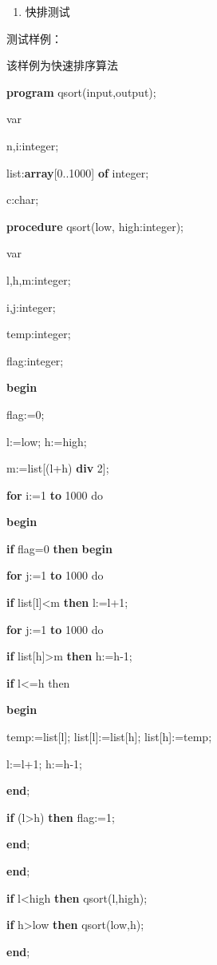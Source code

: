 \documentclass[]{ctexart}
\newenvironment{Shaded}{}{}
\newcommand{\DataTypeTok}[1]{\textcolor[rgb]{0.56,0.13,0.00}{#1}}
\newcommand{\DecValTok}[1]{\textcolor[rgb]{0.25,0.63,0.44}{#1}}
\newcommand{\KeywordTok}[1]{\textcolor[rgb]{0.00,0.44,0.13}{\textbf{#1}}}
\newcommand{\NormalTok}[1]{#1}
\begin{document}
\begin{enumerate}
\def\labelenumi{\arabic{enumi}.}
\item
  快排测试
\end{enumerate}

测试样例：

该样例为快速排序算法

\begin{Shaded}
\begin{Highlighting}[]
\KeywordTok{program}\NormalTok{ qsort(input,output);
}
\NormalTok{var
}
\NormalTok{	n,i:}\DataTypeTok{integer}\NormalTok{;
}
\NormalTok{	list:}\KeywordTok{array}\NormalTok{[}\DecValTok{0}\NormalTok{..}\DecValTok{1000}\NormalTok{] }\KeywordTok{of} \DataTypeTok{integer}\NormalTok{;
}
\NormalTok{	c:}\DataTypeTok{char}\NormalTok{;
}
\KeywordTok{procedure}\NormalTok{ qsort(low, high:}\DataTypeTok{integer}\NormalTok{);
}
\NormalTok{var
}
\NormalTok{	l,h,m:}\DataTypeTok{integer}\NormalTok{;
}
\NormalTok{	i,j:}\DataTypeTok{integer}\NormalTok{;
}
\NormalTok{	temp:}\DataTypeTok{integer}\NormalTok{;
}
\NormalTok{	flag:}\DataTypeTok{integer}\NormalTok{;
}
\KeywordTok{begin}

\NormalTok{	flag:=}\DecValTok{0}\NormalTok{;
}
\NormalTok{	l:=low; h:=high;
}
\NormalTok{	m:=list[(l+h) }\KeywordTok{div} \DecValTok{2}\NormalTok{];
}
	\KeywordTok{for}\NormalTok{ i:=}\DecValTok{1} \KeywordTok{to} \DecValTok{1000}\NormalTok{ do
}
	\KeywordTok{begin}

	\KeywordTok{if}\NormalTok{ flag=}\DecValTok{0} \KeywordTok{then} \KeywordTok{begin}

		\KeywordTok{for}\NormalTok{ j:=}\DecValTok{1} \KeywordTok{to} \DecValTok{1000}\NormalTok{ do
}
			\KeywordTok{if}\NormalTok{ list[l]<m }\KeywordTok{then}\NormalTok{ l:=l+}\DecValTok{1}\NormalTok{;
}
		\KeywordTok{for}\NormalTok{ j:=}\DecValTok{1} \KeywordTok{to} \DecValTok{1000}\NormalTok{ do
}
			\KeywordTok{if}\NormalTok{ list[h]>m }\KeywordTok{then}\NormalTok{ h:=h}\DecValTok{-1}\NormalTok{;
}
		\KeywordTok{if}\NormalTok{ l<=h then
}
		\KeywordTok{begin}

\NormalTok{			temp:=list[l]; list[l]:=list[h]; list[h]:=temp;
}
\NormalTok{			l:=l+}\DecValTok{1}\NormalTok{; h:=h}\DecValTok{-1}\NormalTok{;
}
		\KeywordTok{end}\NormalTok{;
}
		\KeywordTok{if}\NormalTok{ (l>h) }\KeywordTok{then}\NormalTok{ flag:=}\DecValTok{1}\NormalTok{;
}
	\KeywordTok{end}\NormalTok{;
}
	\KeywordTok{end}\NormalTok{;
}
	\KeywordTok{if}\NormalTok{ l<high }\KeywordTok{then}\NormalTok{ qsort(l,high);
}
	\KeywordTok{if}\NormalTok{ h>low }\KeywordTok{then}\NormalTok{ qsort(low,h);
}
\KeywordTok{end}\NormalTok{;
}



\end{Highlighting}
\end{Shaded}
\end{document}
